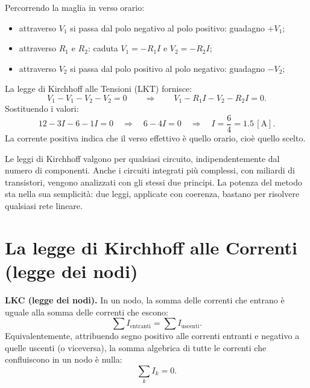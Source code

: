 \begin{esempio}
\begin{center}
\end{center}







Percorrendo la maglia in verso orario:
\begin{itemize}[leftmargin=1cm]
  \item attraverso \(V_1\) si passa dal polo negativo al polo positivo: guadagno \(+V_1\);
  \item attraverso \(R_1\) e \(R_2\): caduta \(V_1 = -R_1 I\) e \(V_2 = -R_2 I\);
  \item attraverso \(V_2\) si passa dal polo positivo al polo negativo: guadagno \(-V_2\);
\end{itemize}

La legge di Kirchhoff alle Tensioni (LKT) fornisce:
\[
V_1 - V_1 - V_2 - V_2 = 0 \qquad\Longrightarrow\qquad
V_1 - R_1 I - V_2 - R_2 I = 0.
\]
Sostituendo i valori:
\[
12 - 3I - 6 - 1I = 0
\quad\Rightarrow\quad
6 - 4I = 0
\quad\Rightarrow\quad
I = \frac{6}{4} = 1.5\,[\text{A}].
\]
La corrente positiva indica che il verso effettivo è quello orario, cioè quello scelto.
\end{esempio}

\begin{curiosita}
Le leggi di Kirchhoff valgono per qualsiasi circuito, indipendentemente dal numero di componenti. Anche i circuiti integrati più complessi, con miliardi di transistori, vengono analizzati con gli stessi due principi. La potenza del metodo sta nella sua semplicità: due leggi, applicate con coerenza, bastano per risolvere qualsiasi rete lineare.
\end{curiosita}

\section{La legge di Kirchhoff alle Correnti (legge dei nodi)}
\begin{concetto}
\textbf{LKC (legge dei nodi).} In un nodo, la somma delle correnti che entrano è uguale alla somma delle correnti che escono:
\[
\sum I_{\text{entranti}} = \sum I_{\text{uscenti}}.
\]
Equivalentemente, attribuendo segno positivo alle correnti entranti e negativo a quelle uscenti (o viceversa), la somma algebrica di tutte le correnti che confluiscono in un nodo è nulla:
\[
\sum_k I_k = 0.
\]
\end{concetto}

